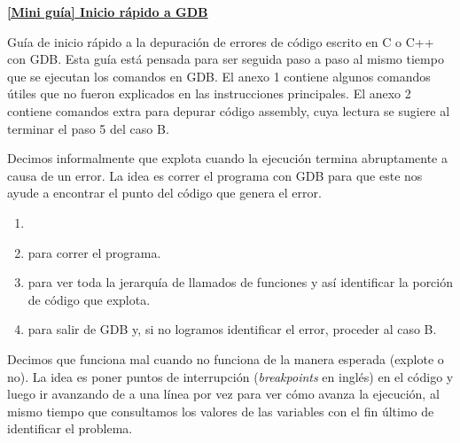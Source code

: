 \textbf{\underline{[Mini guía] Inicio rápido a GDB}}\bigskip

Guía de inicio rápido a la depuración de errores de código escrito en C o C++ con GDB. Esta guía está pensada para ser seguida paso a paso al mismo tiempo que se ejecutan los comandos en GDB. El anexo 1 contiene algunos comandos útiles que no fueron explicados en las instrucciones principales. El anexo 2 contiene comandos extra para depurar código assembly, cuya lectura se sugiere al terminar el paso 5 del caso B.

\bigskip

Decimos informalmente que explota cuando la ejecución termina abruptamente a causa de un error. La idea es correr el programa con GDB para que este nos ayude a encontrar el punto del código que genera el error.\medskip

\begin{enumerate}

\item {}
\item {} para correr el programa.
\item {} para ver toda la jerarquía de llamados de funciones y así identificar la porción de código que explota.
\item {} para salir de GDB y, si no logramos identificar el error, proceder al caso B.

\end{enumerate}

\bigskip

Decimos que funciona mal cuando no funciona de la manera esperada (explote o no). La idea es poner puntos de interrupción (\textit{breakpoints} en inglés) en el código y luego ir avanzando de a una línea por vez para ver cómo avanza la ejecución, al mismo tiempo que consultamos los valores de las variables con el fin último de identificar el problema.\medskip

